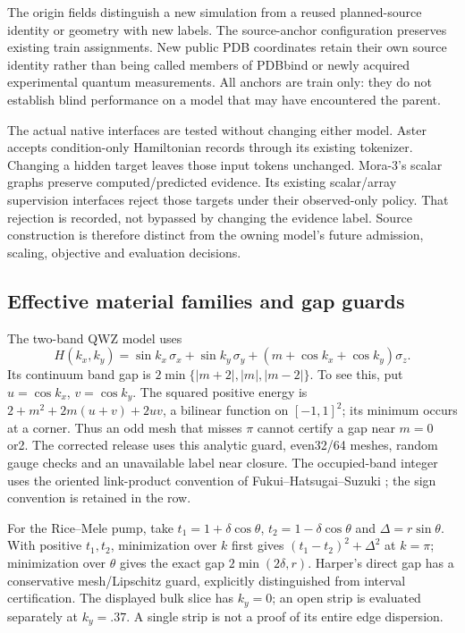 \documentclass[11pt,oneside,openany]{book}
\theoremstyle{definition}\newtheorem{definition}[theorem]{Definition}
\theoremstyle{remark}\newtheorem{remark}[theorem]{Remark}
\begin{document}
The origin fields distinguish a new simulation from a reused planned-source
identity or geometry with new labels. The source-anchor configuration preserves
existing train assignments. New public PDB coordinates retain their own source
identity rather than being called members of PDBbind or newly acquired
experimental quantum measurements. All anchors are train only: they do not
establish blind performance on a model that may have encountered the parent.

The actual native interfaces are tested without changing either model.
Aster accepts condition-only Hamiltonian records through its existing tokenizer.
Changing a hidden target leaves those input tokens unchanged. Mora-3's scalar
graphs preserve computed/predicted evidence. Its existing scalar/array
supervision interfaces reject those targets under their observed-only policy.
That rejection is recorded, not bypassed by changing the evidence label.
Source construction is therefore distinct from the owning model's future
admission, scaling, objective and evaluation decisions.

\subsection{Effective material families and gap guards}
The two-band QWZ model uses
\[
 H(k_x,k_y)=\sin k_x\,\sigma_x+\sin k_y\,\sigma_y
 +(m+\cos k_x+\cos k_y)\sigma_z.
\]
Its continuum band gap is
$2\min\{|m+2|,|m|,|m-2|\}$. To see this, put
$u=\cos k_x$, $v=\cos k_y$. The squared positive energy is
$2+m^2+2m(u+v)+2uv$, a bilinear function on $[-1,1]^2$;
its minimum occurs at a corner. Thus an odd mesh that misses $\pi$ cannot
certify a gap near $m=0$ or2. The corrected release uses this analytic guard,
even32/64 meshes, random gauge checks and an unavailable label near closure.
The occupied-band integer uses the oriented link-product convention of
Fukui--Hatsugai--Suzuki \cite{DSFHS}; the sign convention is retained in the row.

For the Rice--Mele pump, take
$t_1=1+\delta\cos\theta$, $t_2=1-\delta\cos\theta$ and
$\Delta=r\sin\theta$. With positive $t_1,t_2$, minimization over $k$ first
gives $(t_1-t_2)^2+\Delta^2$ at $k=\pi$; minimization over $\theta$ gives
the exact gap $2\min(2\delta,r)$. Harper's direct gap has a conservative
mesh/Lipschitz guard, explicitly distinguished from interval certification.
The displayed bulk slice has $k_y=0$; an open strip is evaluated separately at
$k_y=.37$. A single strip is not a proof of its entire edge dispersion.
\end{document}

